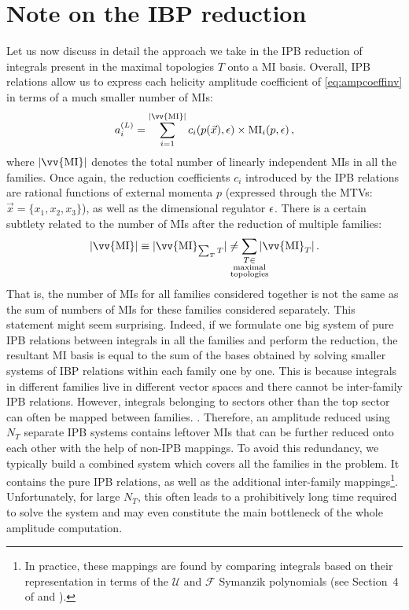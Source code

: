 \documentclass[main.tex]{subfiles}
\begin{document}
\section{Note on the IBP reduction}
Let us now discuss in detail the approach we take in the IPB reduction of integrals present in the maximal topologies $T$ onto a MI basis. Overall, IPB relations allow us to express each helicity amplitude coefficient of \cref{eq:ampcoeffinv} in terms of a much smaller number of MIs:
\begin{equation} \label{eq:ampafterIBP}
	a_i^{(L)} = \sum_{i=1}^{|\vv{\text{MI}}|} c_i(p(\vec{x}), \eps) \times \text{MI}_i(p,\eps)\,,
\end{equation}
where $|\vv{\text{MI}}|$ denotes the total number of linearly independent MIs in all the families. Once again, the reduction coefficients $c_i$ introduced by the IPB relations are rational functions of external momenta $p$ (expressed through the MTVs: $\vec{x} = \{x_1, x_2, x_3\}$), as well as the dimensional regulator $\epsilon$. There is a certain subtlety related to the number of MIs after the reduction of multiple families:
\begin{equation} \label{eq:noofmis}
	|\vv{\text{MI}}| \equiv |\vv{\text{MI}}_{\sum_T T}| \neq \sum_{\mathclap{\substack{T \in \\ \text{maximal} \\ \text{topologies}}}} |\vv{\text{MI}}_T| \,.
\end{equation}
That is, the number of MIs for all families considered together is not the same as the sum of numbers of MIs for these families considered separately. This statement might seem surprising. Indeed, if we formulate one big system of pure IPB relations between integrals in all the families and perform the reduction, the resultant MI basis is equal to the sum of the bases obtained by solving smaller systems of IBP relations within each family one by one. This is because integrals in different families live in different vector spaces and there cannot be inter-family IPB relations. However, integrals belonging to sectors other than the top sector can often be mapped between families. . Therefore, an amplitude reduced using $N_T$ separate IPB systems contains leftover MIs that can be further reduced onto each other with the help of non-IPB mappings. To avoid this redundancy, we typically build a combined system which covers all the families in the problem. It contains the pure IPB relations, as well as the additional inter-family mappings\footnote{In practice, these mappings are found by comparing integrals based on their representation in terms of the $\mathcal{U}$ and $\mathcal{F}$ Symanzik polynomials (see Section~4 of \cite{Lee:2012cn} and \cite{Pak:2011xt}).}. Unfortunately, for large $N_T$, this often leads to a prohibitively long time required to solve the system and may even constitute the main bottleneck of the whole amplitude computation. 
\end{document}
